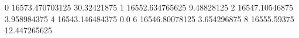 0 16573.470703125 30.32421875
1 16552.634765625 9.48828125
2 16547.10546875 3.958984375
4 16543.146484375 0.0
6 16546.80078125 3.654296875
8 16555.59375 12.447265625
